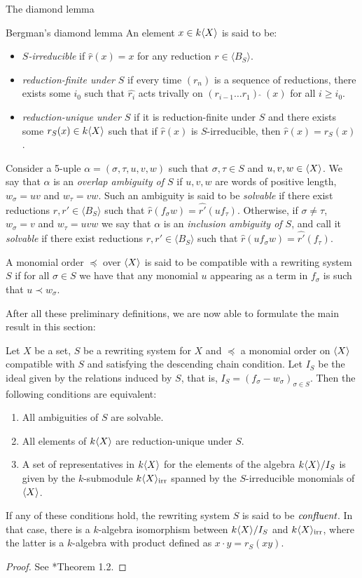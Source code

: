 \begin{chapter}{The diamond lemma}
\begin{section}{Bergman's diamond lemma}
An element $x\in k\langle X\rangle$ is said to be:
\begin{itemize}
\item \emph{$S$-irreducible} if $\hat{r}(x)=x$ for any reduction $r\in\langle B_S\rangle$.
\item \emph{reduction-finite under $S$} if every time $(r_n)$ is a sequence of reductions, there exists some $i_0$ such that $\hat{r_i}$ acts trivally on $(r_{i-1}\dots r_1)\,\widehat{\,}\,(x) $ for all $i\geq i_0$.
\item \emph{reduction-unique under $S$} if it is reduction-finite under $S$ and there exists some $r_S(x)\in k\langle X\rangle$ such that if $\hat{r}(x)$ is $S$-irreducible, then $\hat{r}(x) = r_S(x)$.
\end{itemize}

Consider a 5-uple $\alpha=(\sigma, \tau, u,v,w)$ such that $\sigma,\tau\in S$ and $u,v,w\in \langle X\rangle$. We say that $\alpha$ is an \emph{overlap ambiguity of $S$} if $u,v,w$ are words of positive length, $w_\sigma =uv$ and $w_\tau=vw$. Such an ambiguity is said to be \emph{solvable} if there exist reductions $r,r'\in \langle B_S\rangle$ such that $\hat{r}(f_\sigma w)=\hat{r'}(uf_\tau)$. Otherwise, if $\sigma\neq \tau$, $w_\sigma=v$ and $w_\tau=uvw$ we say that $\alpha$ is an \emph{inclusion ambiguity of $S$}, and call it \emph{solvable} if there exist reductions $r,r'\in \langle B_S\rangle$ such that $\hat{r}(uf_\sigma w)=\hat{r'}(f_\tau)$.

A monomial order $\preceq$ over $\langle X\rangle$ is said to be compatible with a rewriting system $S$ if for all $\sigma \in S$ we have that any monomial $u$ appearing as a term in $f_\sigma$ is such that $u \prec w_\sigma$.

After all these preliminary definitions, we are now able to formulate the main result in this section:

\begin{thm} Let $X$ be a set, $S$ be a rewriting system for $X$ and $\preceq$ a monomial order on $\langle X\rangle$ compatible with $S$ and satisfying the descending chain condition. Let $I_S$ be the ideal given by the relations induced by $S$, that is, $I_S=(f_\sigma-w_\sigma)_{\sigma\in S}$. Then the following conditions are equivalent:
\begin{enumerate}
\item All ambiguities of $S$ are solvable.
\item All elements of $k\langle X\rangle$ are reduction-unique under $S$.
\item A set of representatives in $k\langle X\rangle$ for the elements of the algebra $k\langle X\rangle/I_S$ is given by the $k$-submodule $k\langle X\rangle_{\mathrm{irr}}$ spanned by the $S$-irreducible monomials of $\langle X\rangle$.
\end{enumerate}
If any of these conditions hold, the rewriting system $S$ is said to be $\emph{confluent}$. In that case, there is a $k$-algebra isomorphism between $k\langle X\rangle/I_S$ and $k\langle X\rangle_{\mathrm{irr}}$, where the latter is a $k$-algebra with product defined as $x\cdot y= r_S(xy)$.
\end{thm}
\begin{proof} See {\cite{Ber78}*{Theorem 1.2}}.
\end{proof}


\end{section}
\end{chapter}
